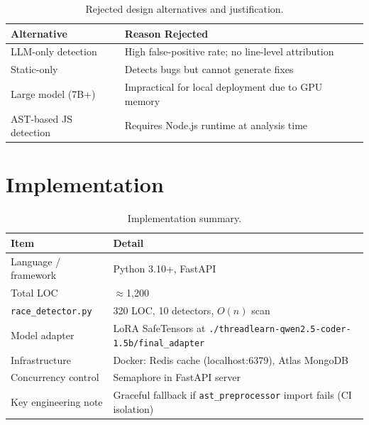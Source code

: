 \documentclass[11pt]{article}
\begin{document}
\begin{table}[ht]
  \centering
  \caption{Rejected design alternatives and justification.}
  \label{tab:rejected}
  \begin{tabular}{@{}lp{8cm}@{}}
    \toprule
    \textbf{Alternative} & \textbf{Reason Rejected} \\
    \midrule
    LLM-only detection     & High false-positive rate; no line-level attribution \\
    Static-only            & Detects bugs but cannot generate fixes \\
    Large model (7B+)      & Impractical for local deployment due to GPU memory \\
    AST-based JS detection & Requires Node.js runtime at analysis time \\
    \bottomrule
  \end{tabular}
\end{table}

\section{Implementation}
\label{sec:impl}

\begin{table}[ht]
  \centering
  \caption{Implementation summary.}
  \label{tab:impl}
  \begin{tabular}{@{}ll@{}}
    \toprule
    \textbf{Item} & \textbf{Detail} \\
    \midrule
    Language / framework     & Python 3.10+, FastAPI \\
    Total LOC                & $\approx$1,200 \\
    \texttt{race\_detector.py} & 320 LOC, 10 detectors, $O(n)$ scan \\
    Model adapter            & LoRA SafeTensors at
                               \texttt{./threadlearn-qwen2.5-coder-1.5b/final\_adapter} \\
    Infrastructure           & Docker: Redis cache (localhost:6379), Atlas MongoDB \\
    Concurrency control      & Semaphore in FastAPI server \\
    Key engineering note     & Graceful fallback if \texttt{ast\_preprocessor}
                               import fails (CI isolation) \\
    \bottomrule
  \end{tabular}
\end{table}
\end{document}
